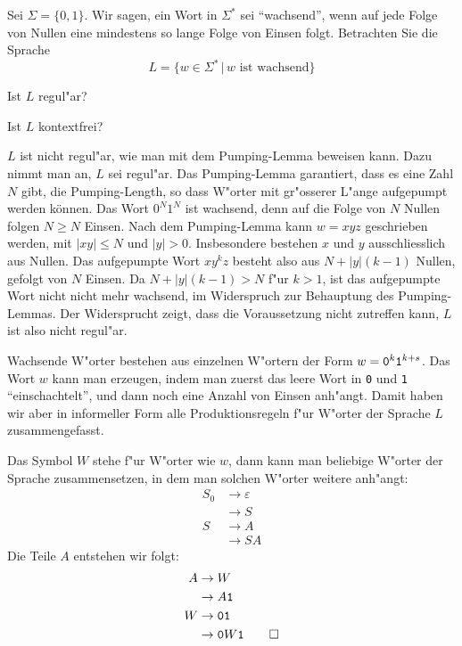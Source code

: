 Sei $\Sigma=\{0,1\}$.
Wir sagen, ein Wort in $\Sigma^*$ sei ``wachsend'',
wenn auf jede Folge von Nullen eine mindestens
so lange Folge von Einsen folgt.
Betrachten Sie die Sprache
\[
L=\{
w\in \Sigma^*\,|\, \text{$w$ ist wachsend}
\}
\]
\begin{teilaufgaben}
\item Ist $L$ regul"ar?
\item Ist $L$ kontextfrei?
\end{teilaufgaben}

\begin{loesung}
\begin{teilaufgaben}
\item
$L$ ist nicht regul"ar, wie man mit dem Pumping-Lemma beweisen kann.
Dazu nimmt man an, $L$ sei regul"ar. Das Pumping-Lemma garantiert, dass
es eine Zahl $N$ gibt, die Pumping-Length, so dass W"orter mit gr"osserer
L"ange aufgepumpt werden können. Das Wort $0^N1^N$ ist wachsend, denn
auf die Folge von $N$ Nullen folgen $N\ge N$ Einsen. Nach dem Pumping-Lemma
kann $w=xyz$ geschrieben werden, mit $|xy|\le N$ und $|y|>0$. Insbesondere bestehen
$x$ und $y$ ausschliesslich aus Nullen. Das aufgepumpte Wort
$xy^kz$ besteht also aus $N+|y|(k-1)$ Nullen, gefolgt von $N$ Einsen.
Da $N+|y|(k-1) > N$ f"ur $k>1$, ist das aufgepumpte Wort nicht nicht
mehr wachsend, im Widerspruch zur Behauptung des Pumping-Lemmas. Der
Widersprucht zeigt, dass die Voraussetzung nicht zutreffen kann, $L$
ist also nicht regul"ar.
\item
Wachsende W"orter bestehen aus einzelnen W"ortern der Form
$w={\tt 0}^k{\tt 1}^{k+s}$.  Das Wort $w$ kann man erzeugen,
indem man zuerst das leere Wort in {\tt 0} und {\tt 1}
``einschachtelt'', und dann noch eine Anzahl von Einsen anh"angt.
Damit haben wir aber in informeller Form alle Produktionsregeln
f"ur W"orter der Sprache $L$ zusammengefasst.

Das Symbol $W$ stehe f"ur W"orter wie $w$, dann kann man beliebige W"orter der
Sprache zusammensetzen, in dem man solchen W"orter weitere anh"angt:
\begin{align*}
S_0&\to \varepsilon\\
   &\to S\\
S&\to A\\
 &\to SA
\end{align*}
Die Teile $A$ entstehen wir folgt:
\begin{align*}
A&\to W\\
 &\to A{\tt 1}\\
W&\to {\tt01}\\
 &\to {\tt 0}W{\tt 1}
\qedhere
\end{align*}
\end{teilaufgaben}
\end{loesung}
